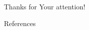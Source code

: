 \begin{frame}[focus]
    Thanks for Your attention!
\end{frame}

\appendix
\begin{frame}{References}
    \nocite{*}
    
    
\end{frame}

